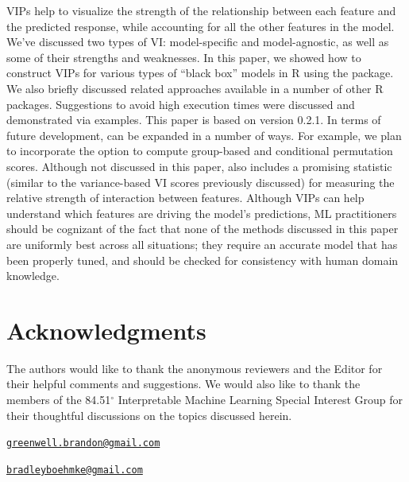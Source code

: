 VIPs help to visualize the strength of the relationship between each
feature and the predicted response, while accounting for all the other
features in the model. We've discussed two types of VI: model-specific
and model-agnostic, as well as some of their strengths and weaknesses.
In this paper, we showed how to construct VIPs for various types of
``black box'' models in R using the  package. We also briefly
discussed related approaches available in a number of other R packages.
Suggestions to avoid high execution times were discussed and
demonstrated via examples. This paper is based on  version
0.2.1. In terms of future development,  can be expanded in a
number of ways. For example, we plan to incorporate the option to
compute group-based and conditional permutation scores. Although not
discussed in this paper,  also includes a promising statistic
(similar to the variance-based VI scores previously discussed) for
measuring the relative strength of interaction between features.
Although VIPs can help understand which features are driving the model's
predictions, ML practitioners should be cognizant of the fact that none
of the methods discussed in this paper are uniformly best across all
situations; they require an accurate model that has been properly tuned,
and should be checked for consistency with human domain knowledge.

\section{Acknowledgments}

The authors would like to thank the anonymous reviewers and the Editor
for their helpful comments and suggestions. We would also like to thank
the members of the 84.51\(^{\circ}\) Interpretable Machine Learning
Special Interest Group for their thoughtful discussions on the topics
discussed herein.




\address{%
Brandon M. Greenwell\\
University of Cincinnati\\
2925 Campus Green Dr\\ Cincinnati, OH 45221\\ United States of America\\ ORCiD---\href{https://orcid.org/0000-0002-8120-0084}{0000-0002-8120-0084}\\
}
\href{mailto:greenwell.brandon@gmail.com}{\nolinkurl{greenwell.brandon@gmail.com}}

\address{%
Bradley C. Boehmke\\
University of Cincinnati\\
2925 Campus Green Dr\\ Cincinnati, OH 45221\\ United States of America\\ ORCiD---\href{https://orcid.org/0000-0002-3611-8516}{0000-0002-3611-8516}\\
}
\href{mailto:bradleyboehmke@gmail.com}{\nolinkurl{bradleyboehmke@gmail.com}}

